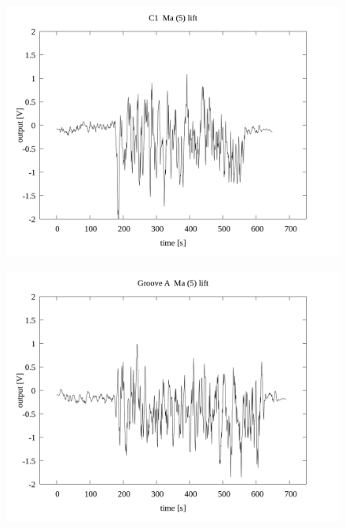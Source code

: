 \documentclass[a4paper]{jsarticle}
\begin{document}
\begin{figure}[htbp]
    \footnotesize
    \begin{center}
        \includegraphics[width=140mm]{../../../../33_result/210806/moving_average/5/lift/01/C1_ma(5)_lift_01.png}
    \end{center}
\end{figure}

\begin{figure}[htbp]
    \footnotesize
    \begin{center}
        \includegraphics[width=140mm]{../../../../33_result/210806/moving_average/5/lift/01/Groove_A_ma(5)_lift_01.png}
    \end{center}
\end{figure}
\end{document}
